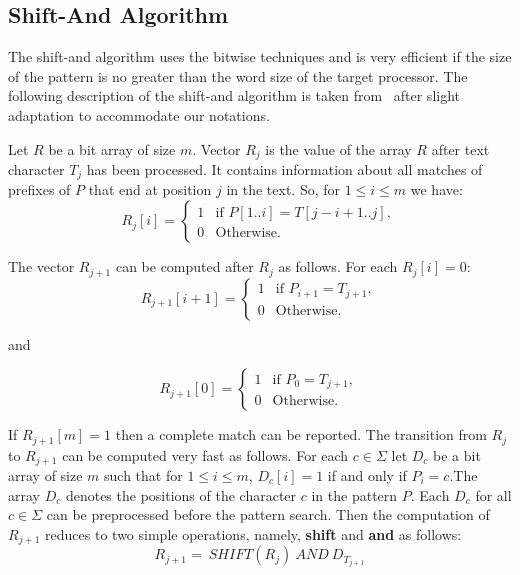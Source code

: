 \documentclass{llncs}
\begin{document}
\subsection{\label{shift-and}Shift-And Algorithm}
The shift-and algorithm uses the bitwise techniques and is very
efficient if the size of the pattern is no greater than the word
size of the target processor. The following description of the
shift-and algorithm is taken from~\cite{CharrasL04} after slight
adaptation to accommodate our notations.

Let $R$ be a bit array of size $m$. Vector $R_j$ is the value of the
array $R$ after text character $T_j$ has been processed. It contains
information about all matches of prefixes of $P$ that end at
position $j$ in the text. So, for $1\leq i\leq m$ we have:
\begin{equation}
R_j[i] = \begin{cases}
                            1& \text{if $P[1..i] = T[j-i+1..j]$},\\
                            0& \text{Otherwise.}
         \end{cases}
\end{equation}

The vector $R_{j+1}$ can be computed after $R_j$ as follows. For
each $R_j[i]=0$:
\begin{equation}
R_{j+1}[i+1] = \begin{cases}
                            1& \text{if $P_{i+1} = T_{j+1}$},\\
                            0& \text{Otherwise.}
         \end{cases}
\end{equation}

and

\begin{equation}
R_{j+1}[0] = \begin{cases}
                            1& \text{if $P_0 = T_{j+1}$},\\
                            0& \text{Otherwise.}
         \end{cases}
\end{equation}

If $R_{j+1}[m]=1$ then a complete match can be reported. The transition from $R_j$ to $R_{j+1}$ can be computed very fast as
follows. For each $c\in\Sigma$ let $D_c$ be a bit array of size $m$
such that for $1\leq i\leq m$, $D_c[i]=1$ if and only if $P_i=c$.The
array $D_c$ denotes the positions of the character $c$ in the
pattern $P$. Each $D_c$ for all $c\in\Sigma$ can be preprocessed
before the pattern search. Then the computation of $R_{j+1}$ reduces
to two simple operations, namely, \textbf{shift} and \textbf{and} as follows: $$R_{j+1}=~ SHIFT(R_j)~ AND~
D_{T_{j+1}}$$
\end{document}
